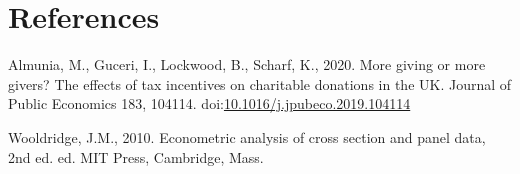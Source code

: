 \documentclass[
  11pt,
  a4paper,
]{article}
\newlength{\cslhangindent}
\newlength{\cslentryspacingunit} %
\newenvironment{CSLReferences}[2] %
 {%
  \setlength{\parindent}{0pt}
  \ifodd #1
  \let\oldpar\par
  \def\par{\hangindent=\cslhangindent\oldpar}
  \fi
  \setlength{\parskip}{#2\cslentryspacingunit}
 }%
 {}
\begin{document}
\newpage

\hypertarget{references}{%
\section*{References}\label{references}}

\hypertarget{refs}{}
\begin{CSLReferences}{1}{0}
\leavevmode{}%
Almunia, M., Guceri, I., Lockwood, B., Scharf, K., 2020. More giving or more givers? {The} effects of tax incentives on charitable donations in the {UK}. Journal of Public Economics 183, 104114. doi:\href{https://doi.org/10.1016/j.jpubeco.2019.104114}{10.1016/j.jpubeco.2019.104114}

\leavevmode{}%
Wooldridge, J.M., 2010. Econometric analysis of cross section and panel data, 2nd ed. ed. {MIT Press}, {Cambridge, Mass}.

\end{CSLReferences}
\end{document}
